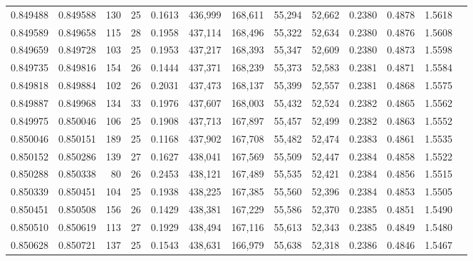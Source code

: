 \begin{tabular}{rrrrrrrrrrrrr}
0.849488 & 0.849588 &   130 &  25 &                                     0.1613 & 436,999 & 168,611 &  55,294 &  52,662 & 0.2380 & 0.4878 & 1.5618 \\
0.849589 & 0.849658 &   115 &  28 &                                     0.1958 & 437,114 & 168,496 &  55,322 &  52,634 & 0.2380 & 0.4876 & 1.5608 \\
0.849659 & 0.849728 &   103 &  25 &                                     0.1953 & 437,217 & 168,393 &  55,347 &  52,609 & 0.2380 & 0.4873 & 1.5598 \\
0.849735 & 0.849816 &   154 &  26 &                                     0.1444 & 437,371 & 168,239 &  55,373 &  52,583 & 0.2381 & 0.4871 & 1.5584 \\
0.849818 & 0.849884 &   102 &  26 &                                     0.2031 & 437,473 & 168,137 &  55,399 &  52,557 & 0.2381 & 0.4868 & 1.5575 \\
0.849887 & 0.849968 &   134 &  33 &                                     0.1976 & 437,607 & 168,003 &  55,432 &  52,524 & 0.2382 & 0.4865 & 1.5562 \\
0.849975 & 0.850046 &   106 &  25 &                                     0.1908 & 437,713 & 167,897 &  55,457 &  52,499 & 0.2382 & 0.4863 & 1.5552 \\
0.850046 & 0.850151 &   189 &  25 &                                     0.1168 & 437,902 & 167,708 &  55,482 &  52,474 & 0.2383 & 0.4861 & 1.5535 \\
0.850152 & 0.850286 &   139 &  27 &                                     0.1627 & 438,041 & 167,569 &  55,509 &  52,447 & 0.2384 & 0.4858 & 1.5522 \\
0.850288 & 0.850338 &    80 &  26 &                                     0.2453 & 438,121 & 167,489 &  55,535 &  52,421 & 0.2384 & 0.4856 & 1.5515 \\
0.850339 & 0.850451 &   104 &  25 &                                     0.1938 & 438,225 & 167,385 &  55,560 &  52,396 & 0.2384 & 0.4853 & 1.5505 \\
0.850451 & 0.850508 &   156 &  26 &                                     0.1429 & 438,381 & 167,229 &  55,586 &  52,370 & 0.2385 & 0.4851 & 1.5490 \\
0.850510 & 0.850619 &   113 &  27 &                                     0.1929 & 438,494 & 167,116 &  55,613 &  52,343 & 0.2385 & 0.4849 & 1.5480 \\
0.850628 & 0.850721 &   137 &  25 &                                     0.1543 & 438,631 & 166,979 &  55,638 &  52,318 & 0.2386 & 0.4846 & 1.5467 \\

\end{tabular}
